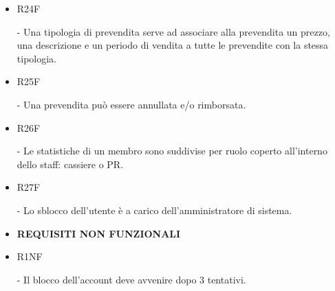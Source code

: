 \documentclass[a4paper]{article}
\begin{document}
\begin{itemize}
	\item \hypertarget{R24F}{R24F} - Una tipologia di prevendita serve ad associare alla prevendita un prezzo, una descrizione e un periodo di vendita a tutte le prevendite con la stessa tipologia.

	\item \hypertarget{R25F}{R25F} - Una prevendita può essere annullata e/o rimborsata. 
	
	\item \hypertarget{R26F}{R26F} - Le statistiche di un membro sono suddivise per ruolo coperto all'interno dello staff: cassiere o PR.
	
	\item \hypertarget{R27F}{R27F} - Lo sblocco dell'utente è a carico dell'amministratore di sistema.
	
	
		
    \item \textbf{REQUISITI NON FUNZIONALI}
	
	\item \hypertarget{R1NF}{R1NF} - Il blocco dell'account deve avvenire dopo 3 tentativi.
	

\end{itemize}
\end{document}
